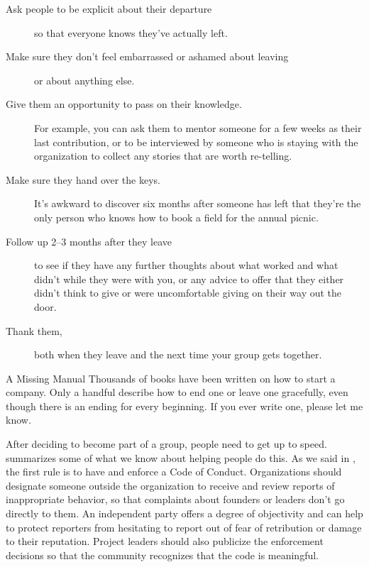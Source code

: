 \begin{description}

\item[Ask people to be explicit about their departure]
  so that everyone knows they've actually left.

\item[Make sure they don't feel embarrassed or ashamed about leaving]
  or about anything else.

\item[Give them an opportunity to pass on their knowledge.]
  For example,
  you can ask them to mentor someone for a few weeks as   their last contribution,
  or to be interviewed by someone who is staying with the organization
  to collect any stories that are worth re-telling.

\item[Make sure they hand over the keys.]
  It's awkward to discover six months after someone has left
  that they're the only person who knows how to book a field for the annual picnic.

\item[Follow up 2--3 months after they leave]
  to see if they have any further thoughts about what worked and what didn't while they were with you,
  or any advice to offer that they either didn't think to give
  or were uncomfortable giving on their way out the door.

\item[Thank them,]
  both when they leave and the next time your group gets together.

\end{description}

\begin{aside}{A Missing Manual}
  Thousands of books have been written on how to start a company.
  Only a handful describe how to end one or leave one gracefully,
  even though there is an ending for every beginning.
  If you ever write one,
  please let me know.
\end{aside}


After deciding to become part of a group,
people need to get up to speed.
\cite{Shol2019} summarizes some of what we know about helping people do this.
As we said in ,
the first rule is to have and enforce a Code of Conduct.
Organizations should designate someone outside the organization
to receive and review reports of inappropriate behavior,
so that complaints about founders or leaders don't go directly to them.
An independent party offers a degree of objectivity
and can help to protect reporters from hesitating to report out of fear of retribution or damage to their reputation.
Project leaders should also publicize the enforcement decisions
so that the community recognizes that the code is meaningful.


